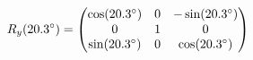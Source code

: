 \documentclass[preview]{standalone}
\begin{document}
\begin{align*}
\special{dvisvgm:raw <g id='unique000'>}R_y(20.3^\circ) = \begin{pmatrix} \cos(20.3^\circ) & 0 & -\sin(20.3^\circ) \\ 0 & 1 & 0 \\ \sin(20.3^\circ) & 0 & \cos(20.3^\circ) \end{pmatrix}\special{dvisvgm:raw </g>}
\end{align*}
\end{document}
